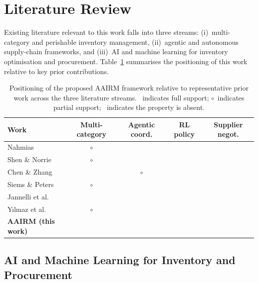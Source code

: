 \documentclass[utf8]{FrontiersinHarvard}
\begin{document}
	\section{Literature Review}
	\label{sec:related}

	Existing literature relevant to this work falls into three streams:
	(i)~multi-category and perishable inventory management, (ii)~agentic and
	autonomous supply-chain frameworks, and (iii)~AI and machine learning for
	inventory optimisation and procurement.  Table~\ref{tab:litreview}
	summarises the positioning of this work relative to key prior contributions.

	\begin{table}[htbp]
		\centering
		\caption{Positioning of the proposed AAIRM framework relative to
			representative prior work across the three literature streams.
			\checkmark~indicates full support; $\circ$~indicates partial
			support; \textemdash~indicates the property is absent.}
		\label{tab:litreview}
		\begin{tabularx}{\linewidth}{Xcccc}
			\toprule
			\textbf{Work} &
			\textbf{Multi-category} &
			\textbf{Agentic coord.} &
			\textbf{RL policy} &
			\textbf{Supplier negot.} \\
			\midrule
			Nahmias \cite{nahmias1982perishable}           & $\circ$ & \textemdash & \textemdash & \textemdash \\
			Shen \& Norrie \cite{shen1999multiagent}       & $\circ$ & \checkmark  & \textemdash & \textemdash \\
			Chen \& Zhang \cite{chen2020multiproduct}      & \checkmark & $\circ$  & \checkmark  & \textemdash \\
			Siems \& Peters \cite{siems2023interpretable}  & $\circ$ & \textemdash & \checkmark  & \textemdash \\
			Jannelli et al.\ \cite{jannelli2024agentic}    & \textemdash & \checkmark & \textemdash & \checkmark \\
			Yılmaz et al.\ \cite{yilmaz2024aiinventory}   & $\circ$ & \textemdash & \textemdash & \textemdash \\
			\textbf{AAIRM (this work)}                      & \checkmark & \checkmark & \checkmark  & \checkmark \\
			\bottomrule
		\end{tabularx}
	\end{table}

	\subsection{AI and Machine Learning for Inventory and Procurement}
\end{document}
